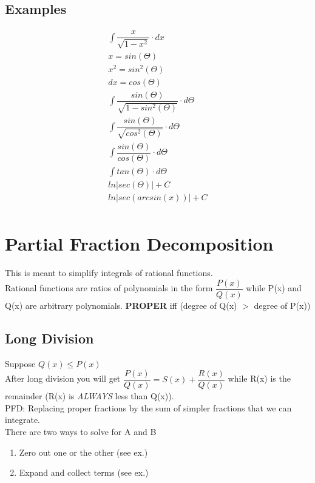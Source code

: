 \documentclass{article}
\begin{document}
\subsection*{Examples}
\begin{equation}
\begin{aligned}
\int \dfrac{x}{\sqrt{1-x^2} } \cdot dx\\
x = sin(\Theta)\\
x^2 = sin^2(\Theta)\\
dx = cos(\Theta)\\
\int \dfrac{sin(\Theta)}{\sqrt{1-sin^2(\Theta)} } \cdot d\Theta\\
\int \dfrac{sin(\Theta)}{\sqrt{cos^2(\Theta)} } \cdot d\Theta\\
\int \dfrac{sin(\Theta)}{cos(\Theta)} \cdot d\Theta\\
\int tan(\Theta) \cdot d\Theta\\
ln|sec(\Theta)|+C\\
ln|sec(arcsin(x))|+C\\
\end{aligned}
\end{equation}
\section{Partial Fraction Decomposition}
This is meant to simplify integrals of rational functions.\\
\indent Rational functions are ratios of polynomials in the form $ \dfrac{P(x)}{Q(x)} $ while P(x) and Q(x) are arbitrary polynomials.
\textbf{PROPER} iff (degree of Q(x) $>$ degree of P(x))
\subsection*{Long Division}
Suppose $ Q(x) \le P(x) $\\
After long division you will get $ \dfrac{P(x)}{Q(x)}=S(x)+\dfrac{R(x)}{Q(x)} $ while R(x) is the remainder (R(x) is \textit{ALWAYS} less than Q(x)).\\
PFD: Replacing proper fractions by the sum of simpler fractions that we can integrate.\\
There are two ways to solve for A and B
\begin{enumerate}
\item Zero out one or the other (see ex.)
\item Expand and collect terms (see ex.)
\end{enumerate}
\end{document}
